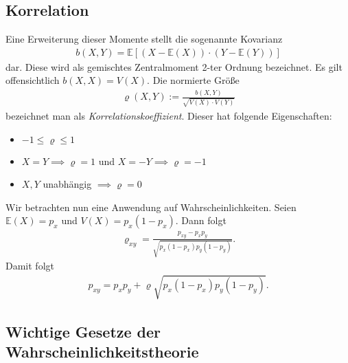 \documentclass[10pt, a4paper]{extarticle}
\theoremstyle{nonumberplain}
\theoremstyle{plain}
\begin{document}
\subsection{Korrelation}
Eine Erweiterung dieser Momente stellt die sogenannte Kovarianz \begin{align*}
b(X,Y)=\mathbb{E}[(X-\mathbb{E}(X))\cdot(Y-\mathbb{E}(Y))]
\end{align*}
dar. Diese wird als gemischtes Zentralmoment 2-ter Ordnung bezeichnet. Es gilt offensichtlich $ b(X,X)=V(X) $. Die normierte Größe \begin{align*}
\varrho(X,Y) :=\frac{b(X,Y)}{\sqrt{V(X)\cdot V(Y)}}
\end{align*}
bezeichnet man als \emph{Korrelationskoeffizient}. Dieser hat folgende Eigenschaften:
\begin{itemize}
\item $ -1\leq \varrho\leq 1 $
\item $ X=Y\implies \varrho=1 $ und $ X=-Y\implies \varrho=-1 $
\item $ X,Y $ unabhängig $ \implies \varrho=0 $
\end{itemize}
Wir betrachten nun eine Anwendung auf Wahrscheinlichkeiten. Seien $ \mathbb{E}(X)=p_x $ und $ V(X)=p_x(1-p_x) $. Dann folgt \begin{align*}
\varrho_{xy}=\frac{p_{xy}-p_xp_y}{\sqrt{p_x(1-p_x)p_y(1-p_y)}}.
\end{align*}
Damit folgt \begin{align*}
p_{xy}=p_xp_y+\varrho\sqrt{p_x(1-p_x)p_y(1-p_y)}.
\end{align*}

\subsection{Wichtige Gesetze der Wahrscheinlichkeitstheorie}
\end{document}

